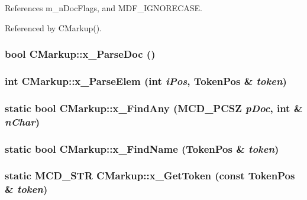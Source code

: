 References m\_\-nDocFlags, and MDF\_\-IGNORECASE.

Referenced by CMarkup().
\subsubsection[x\_\-ParseDoc]{\setlength{\rightskip}{0pt plus 5cm}bool CMarkup::x\_\-ParseDoc ()\hspace{0.3cm}{\tt  [protected]}}\label{classCMarkup_380c4a7ec48c76192c812e647a4a7e4e}


\subsubsection[x\_\-ParseElem]{\setlength{\rightskip}{0pt plus 5cm}int CMarkup::x\_\-ParseElem (int {\em iPos}, \/  {\bf TokenPos} \& {\em token})\hspace{0.3cm}{\tt  [protected]}}\label{classCMarkup_c92b4883b891cb7f1c293c4801f5963c}


\subsubsection[x\_\-FindAny]{\setlength{\rightskip}{0pt plus 5cm}static bool CMarkup::x\_\-FindAny (MCD\_\-PCSZ {\em pDoc}, \/  int \& {\em nChar})\hspace{0.3cm}{\tt  [static, protected]}}\label{classCMarkup_ce7bf02a001c0ff3b33142e936c4415f}


\subsubsection[x\_\-FindName]{\setlength{\rightskip}{0pt plus 5cm}static bool CMarkup::x\_\-FindName ({\bf TokenPos} \& {\em token})\hspace{0.3cm}{\tt  [static, protected]}}\label{classCMarkup_873190d7a7ce765cb6c14f0a3f9758dc}


\subsubsection[x\_\-GetToken]{\setlength{\rightskip}{0pt plus 5cm}static MCD\_\-STR CMarkup::x\_\-GetToken (const {\bf TokenPos} \& {\em token})\hspace{0.3cm}{\tt  [static, protected]}}\label{classCMarkup_aeb5a1390a8c97c469ade070acb5d710}


